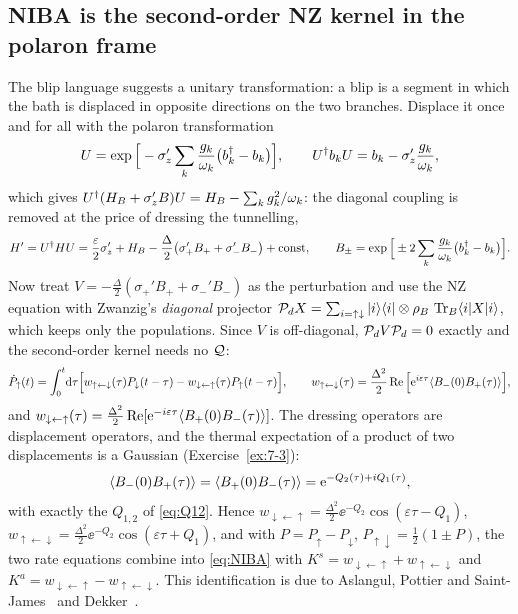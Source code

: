 \subsection{NIBA is the second-order NZ kernel in the polaron frame}

The blip language suggests a unitary transformation: a blip is a segment in which the bath is displaced in opposite directions on the two branches.
Displace it once and for all with the polaron transformation~\cite{SilbeyHarris1984}
\begin{equation}
  U=\exp\Big[-\sigma_z'\sum_k\frac{g_k}{\omega_k}\big(b_k^\dagger-b_k\big)\Big],\qquad
  U^\dagger b_kU=b_k-\sigma_z'\frac{g_k}{\omega_k},
\end{equation}
which gives $U^\dagger(H_B+\sigma_z'B)U=H_B-\sum_kg_k^2/\omega_k$: the diagonal coupling is removed at the price of dressing the tunnelling,
\begin{equation}
  H'=U^\dagger HU=\frac{\varepsilon}{2}\sigma_z'+H_B-\frac{\Delta}{2}\big(\sigma_+'B_++\sigma_-'B_-\big)+\text{const},\qquad
  B_\pm=\exp\Big[\pm2\sum_k\frac{g_k}{\omega_k}\big(b_k^\dagger-b_k\big)\Big].
  \label{eq:polaron-H}
\end{equation}
Now treat $V=-\tfrac\Delta2(\sigma_+'B_++\sigma_-'B_-)$ as the perturbation and use the NZ equation with Zwanzig's \emph{diagonal} projector $\mathcal{P}_dX=\sum_{i=\uparrow\downarrow}|i\rangle\langle i|\otimes\rho_{B}\,\operatorname{Tr}_B\langle i|X|i\rangle$, which keeps only the populations.
Since $V$ is off-diagonal, $\mathcal{P}_dV\mathcal{P}_d=0$ exactly and the second-order kernel needs no $\mathcal{Q}$:
\begin{equation}
  \dot P_\uparrow(t)=\int_0^t\!\mathrm{d}\tau\Big[w_{\uparrow\leftarrow\downarrow}(\tau)P_\downarrow(t-\tau)-w_{\downarrow\leftarrow\uparrow}(\tau)P_\uparrow(t-\tau)\Big],
  \qquad w_{\uparrow\leftarrow\downarrow}(\tau)=\frac{\Delta^2}{2}\operatorname{Re}\Big[\mathrm{e}^{i\varepsilon\tau}\langle B_-(0)B_+(\tau)\rangle\Big],
\end{equation}
and $w_{\downarrow\leftarrow\uparrow}(\tau)=\frac{\Delta^2}2\operatorname{Re}[\mathrm{e}^{-i\varepsilon\tau}\langle B_+(0)B_-(\tau)\rangle]$.
The dressing operators are displacement operators, and the thermal expectation of a product of two displacements is a Gaussian (Exercise~\ref{ex:7-3}):
\begin{equation}
  \langle B_-(0)B_+(\tau)\rangle=\langle B_+(0)B_-(\tau)\rangle=\mathrm{e}^{-Q_2(\tau)+iQ_1(\tau)},
  \label{eq:FC}
\end{equation}
with exactly the $Q_{1,2}$ of \cref{eq:Q12}.
Hence $w_{\downarrow\leftarrow\uparrow}=\tfrac{\Delta^2}2\ee^{-Q_2}\cos(\varepsilon\tau-Q_1)$, $w_{\uparrow\leftarrow\downarrow}=\tfrac{\Delta^2}2\ee^{-Q_2}\cos(\varepsilon\tau+Q_1)$, and with $P=P_\uparrow-P_\downarrow$, $P_{\uparrow\downarrow}=\tfrac12(1\pm P)$, the two rate equations combine into \cref{eq:NIBA} with $K^s=w_{\downarrow\leftarrow\uparrow}+w_{\uparrow\leftarrow\downarrow}$ and $K^a=w_{\downarrow\leftarrow\uparrow}-w_{\uparrow\leftarrow\downarrow}$.
This identification is due to Aslangul, Pottier and Saint-James~\cite{Aslangul1986} and Dekker~\cite{Dekker1987}.

